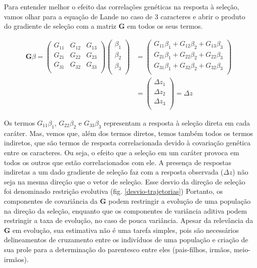 \documentclass[portuges,]{tufte-handout}
\begin{document}
Para entender melhor o efeito das correlações genéticas na resposta à
seleção, vamos olhar para a equação de Lande no caso de 3 caracteres e
abrir o produto do gradiente de seleção com a matriz $\mathbf{G}$ em
todos os seus termos.

\begin{align}
\mathbf{G}\beta  =
\left (
\begin{matrix}
G_{11} & G_{12} & G_{13}\\
G_{21} & G_{22} & G_{23} \\
G_{31} & G_{32} & G_{33}\\
\end{matrix}
\right )
\left (
\begin{matrix}
\beta_{1}  \\
\beta_{2}   \\
\beta_{3}  \\
\end{matrix}
\right )
&=
\left (
\begin{matrix}
G_{11}\beta_{1} +  G_{12}\beta_{2} +  G_{13}\beta_{3}\\
G_{21}\beta_{1} +  G_{22}\beta_{2} +  G_{22}\beta_{3}\\
G_{31}\beta_{1} +  G_{32}\beta_{2} +  G_{32}\beta_{3}\\
\end{matrix}
\right )
\\
&=
\left (
\begin{matrix}
\Delta z_{1}  \\
\Delta z_{2}   \\
\Delta z_{3}  \\
\end{matrix}
\right )
=
\Delta z
\end{align}

Os termos $G_{11}\beta_{1}$, $G_{22}\beta_{2}$ e $G_{33}\beta_{3}$
representam a resposta à seleção direta em cada caráter. Mas, vemos que,
além dos termos diretos, temos também todos os termos indiretos, que são
termos de resposta correlacionada devido à covariação genética entre os
caracteres. Ou seja, o efeito que a seleção em um caráter provoca em
todos os outros que estão correlacionados com ele. A presença de
respostas indiretas a um dado gradiente de seleção faz com a resposta
observada ($\Delta z$) não seja na mesma direção que o vetor de seleção.
Esse desvio da direção de seleção foi denominado restrição evolutiva
(fig. \ref{desvio-trajetorias}) Portanto, os componentes de covariância
da $\mathbf{G}$ podem restringir a evolução de uma população na direção
da seleção, enquanto que os componentes de variância aditiva podem
restringir a taxa de evolução, no caso de pouca variância. Apesar da
relevância da $\mathbf{G}$ em evolução, sua estimativa não é uma tarefa
simples, pois são necessários delineamentos de cruzamento entre os
indivíduos de uma população e criação de sua prole para a determinação
do parentesco entre eles (pais-filhos, irmãos, meio-irmãos).
\end{document}
